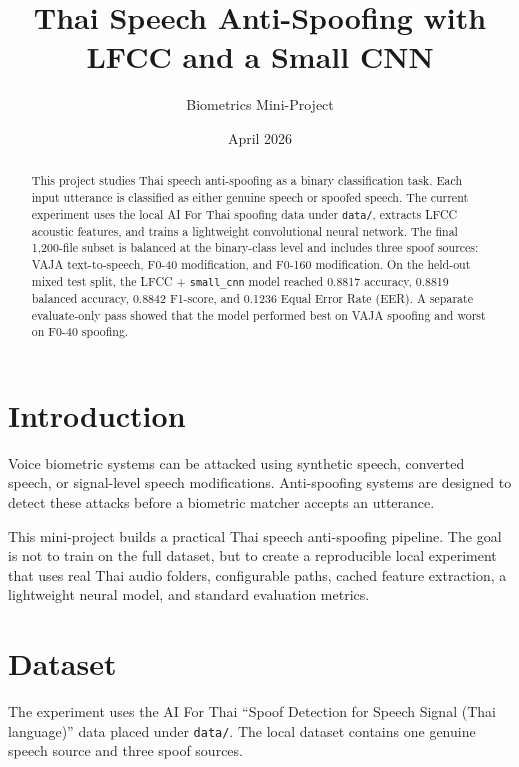 \documentclass[11pt,a4paper]{article}
\title{Thai Speech Anti-Spoofing with LFCC and a Small CNN}
\author{Biometrics Mini-Project}
\date{April 2026}
\begin{document}
\maketitle

\begin{abstract}
This project studies Thai speech anti-spoofing as a binary classification task. Each input utterance is classified as either genuine speech or spoofed speech. The current experiment uses the local AI For Thai spoofing data under \texttt{data/}, extracts LFCC acoustic features, and trains a lightweight convolutional neural network. The final 1,200-file subset is balanced at the binary-class level and includes three spoof sources: VAJA text-to-speech, F0-40 modification, and F0-160 modification. On the held-out mixed test split, the LFCC + \texttt{small\_cnn} model reached 0.8817 accuracy, 0.8819 balanced accuracy, 0.8842 F1-score, and 0.1236 Equal Error Rate (EER). A separate evaluate-only pass showed that the model performed best on VAJA spoofing and worst on F0-40 spoofing.
\end{abstract}

\section{Introduction}

Voice biometric systems can be attacked using synthetic speech, converted speech, or signal-level speech modifications. Anti-spoofing systems are designed to detect these attacks before a biometric matcher accepts an utterance.

This mini-project builds a practical Thai speech anti-spoofing pipeline. The goal is not to train on the full dataset, but to create a reproducible local experiment that uses real Thai audio folders, configurable paths, cached feature extraction, a lightweight neural model, and standard evaluation metrics.

\section{Dataset}

The experiment uses the AI For Thai ``Spoof Detection for Speech Signal (Thai language)'' data placed under \texttt{data/}. The local dataset contains one genuine speech source and three spoof sources.
\end{document}

